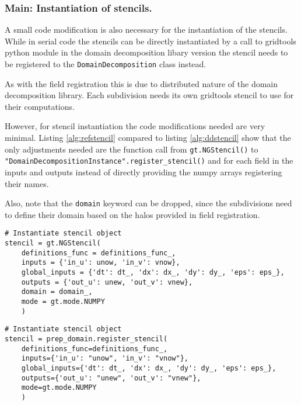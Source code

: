 \subsubsection{Main: Instantiation of stencils.}
A small code modification is also necessary for the instantiation of the stencils.
While in serial code the stencils can be directly instantiated by a call to gridtools python module in the domain decomposition libary version the stencil needs to be registered to the \texttt{DomainDecomposition} class instead.

As with the field registration this is due to distributed nature of the domain decomposition library.
Each subdivision needs its own gridtools stencil to use for their computations.

However, for stencil instantiation the code modifications needed are very minimal.
Listing \ref{alg:refstencil} compared to listing \ref{alg:ddstencil} show that the only adjustments needed are the function call from \texttt{gt.NGStencil()} to \texttt{"DomainDecompositionInstance".register\_stencil()} and for each field in the inputs and outputs instead of directly providing the numpy arrays registering their names.

Also, note that the \texttt{domain} keyword can be dropped, since the subdivisions need to define their domain based on the halos provided in field registration.

\begin{lstlisting}[caption={Example code for the original user stencil instantiation.},captionpos=b, label={alg:refstencil}, float, floatplacement=H]
# Instantiate stencil object
stencil = gt.NGStencil(
    definitions_func = definitions_func_,
    inputs = {'in_u': unow, 'in_v': vnow},
    global_inputs = {'dt': dt_, 'dx': dx_, 'dy': dy_, 'eps': eps_},
    outputs = {'out_u': unew, 'out_v': vnew},
    domain = domain_,
    mode = gt.mode.NUMPY
    )
\end{lstlisting}

\begin{lstlisting}[caption={Example code for the same stencil instantiation using the domain decomposition library.},captionpos=b, label={alg:ddstencil}, float, floatplacement=H]
# Instantiate stencil object
stencil = prep_domain.register_stencil(
    definitions_func=definitions_func_,
    inputs={'in_u': "unow", 'in_v': "vnow"},
    global_inputs={'dt': dt_, 'dx': dx_, 'dy': dy_, 'eps': eps_},
    outputs={'out_u': "unew", 'out_v': "vnew"},
    mode=gt.mode.NUMPY
    )
\end{lstlisting}

